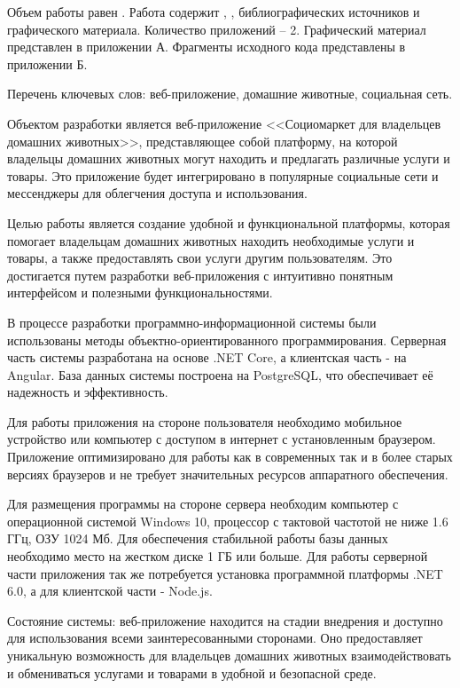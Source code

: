 
Объем работы равен . Работа содержит , ,  библиографических источников и  графического материала. Количество приложений – 2. Графический материал представлен в приложении А. Фрагменты исходного кода представлены в приложении Б.

Перечень ключевых слов: веб-приложение, домашние животные, социальная сеть.

Объектом разработки является веб-приложение <<Социомаркет для владельцев домашних животных>>, представляющее собой платформу, на которой владельцы домашних животных могут находить и предлагать различные услуги и товары. Это приложение будет интегрировано в популярные социальные сети и мессенджеры для облегчения доступа и использования.

Целью работы является создание удобной и функциональной платформы, которая помогает владельцам домашних животных находить необходимые услуги и товары, а также предоставлять свои услуги другим пользователям. Это достигается путем разработки веб-приложения с интуитивно понятным интерфейсом и полезными функциональностями.

В процессе разработки программно-информационной системы были использованы методы объектно-ориентированного программирования. Серверная часть системы разработана на основе .NET Core, а клиентская часть -\- на Angular. База данных системы построена на PostgreSQL, что обеспечивает её надежность и эффективность.

Для работы приложения на стороне пользователя необходимо мобильное устройство или компьютер с доступом в интернет с установленным браузером. Приложение оптимизировано для работы как в современных так и в более старых версиях браузеров и не требует значительных ресурсов аппаратного обеспечения.

Для размещения программы на стороне сервера необходим компьютер с операционной системой Windows 10, процессор с тактовой частотой не ниже 1.6 ГГц, ОЗУ 1024 Мб. Для обеспечения стабильной работы базы данных необходимо место на жестком диске 1 ГБ или больше. Для работы серверной части приложения так же потребуется установка программной платформы .NET 6.0, а для клиентской части -\- Node.js.

Состояние системы: веб-приложение находится на стадии внедрения и доступно для использования всеми заинтересованными сторонами. Оно предоставляет уникальную возможность для владельцев домашних животных взаимодействовать и обмениваться услугами и товарами в удобной и безопасной среде.

